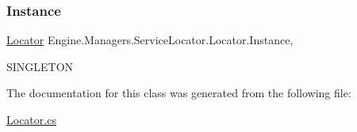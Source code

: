 \subsubsection{\texorpdfstring{Instance}{Instance}}
{\footnotesize\ttfamily \hyperlink{a00542}{Locator} Engine.\+Managers.\+Service\+Locator.\+Locator.\+Instance\hspace{0.3cm}{\ttfamily [static]}, {\ttfamily [get]}}



S\+I\+N\+G\+L\+E\+T\+ON 



The documentation for this class was generated from the following file\+:\begin{DoxyCompactItemize}
\item 
\hyperlink{a00188}{Locator.\+cs}\end{DoxyCompactItemize}

